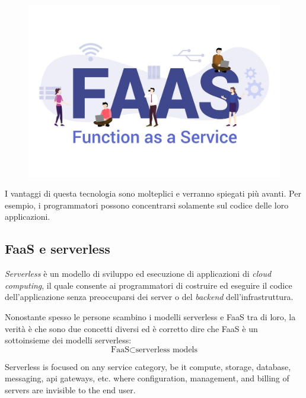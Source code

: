\documentclass[a4paper]{article}
\begin{document}
	\begin{figure}[!htp]
		\centering
		\includegraphics[width=\textwidth]{img/faas-1.jpg}
	\end{figure}
	
	\noindent
	I vantaggi di questa tecnologia sono molteplici e verranno spiegati più avanti. Per esempio, i programmatori possono concentrarsi solamente sul codice delle loro applicazioni.
	
	\newpage
	
	\subsection{FaaS e serverless}
	
	\emph{Serverless} è un modello di sviluppo ed esecuzione di applicazioni di \emph{cloud computing}, il quale consente ai programmatori di costruire ed eseguire il codice dell'applicazione senza preoccuparsi dei server o del \emph{backend} dell'infrastruttura.
	
	Nonostante spesso le persone scambino i modelli serverless e FaaS tra di loro, la verità è che sono due concetti diversi ed è corretto dire che FaaS è un sottoinsieme dei modelli serverless:
	\begin{equation*}
		\text{FaaS} \subset \text{serverless models}
	\end{equation*}
	
	Serverless is focused on any service category, be it compute, storage, database, messaging, api gateways, etc. where configuration, management, and billing of servers are invisible to the end user.
	
\end{document}
